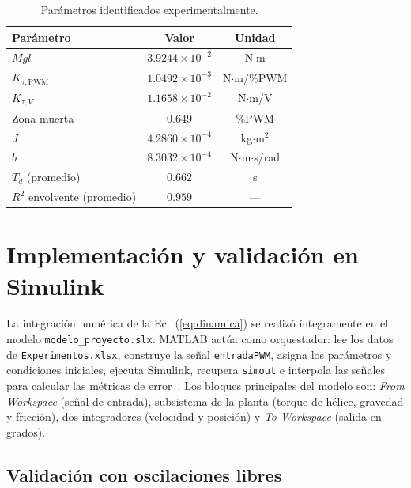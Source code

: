 \documentclass[journal, 10pt, twocolumn]{IEEEtran}
\begin{document}
\begin{table}[H]
  \centering
  \caption{Parámetros identificados experimentalmente.}
  \label{tab:parametros}
  \begin{tabular}{lcc}
    \toprule
    Parámetro & Valor & Unidad \\
    \midrule
    $Mgl$                          & $3.9244\times10^{-2}$  & N$\cdot$m \\
    $K_{\tau,\mathrm{PWM}}$        & $1.0492\times10^{-3}$  & N$\cdot$m/\%PWM \\
    $K_{\tau,V}$                   & $1.1658\times10^{-2}$  & N$\cdot$m/V \\
    Zona muerta                    & $0.649$                & \%PWM \\
    $J$                            & $4.2860\times10^{-4}$  & kg$\cdot$m$^2$ \\
    $b$                            & $8.3032\times10^{-4}$  & N$\cdot$m$\cdot$s/rad \\
    $T_d$ (promedio)               & $0.662$                & s \\
    $R^2$ envolvente (promedio)    & $0.959$                & --- \\
    \bottomrule
  \end{tabular}
\end{table}

\section{Implementación y validación en Simulink}

La integración numérica de la Ec.~(\ref{eq:dinamica}) se realizó
íntegramente en el modelo \texttt{modelo\_proyecto.slx}. MATLAB actúa
como orquestador: lee los datos de \texttt{Experimentos.xlsx}, construye
la señal \texttt{entradaPWM}, asigna los parámetros y condiciones iniciales,
ejecuta Simulink, recupera \texttt{simout} e interpola las señales para
calcular las métricas de error~\cite{fromws}. Los bloques principales del
modelo son: \textit{From Workspace} (señal de entrada), subsistema de la
planta (torque de hélice, gravedad y fricción), dos integradores (velocidad
y posición) y \textit{To Workspace} (salida en grados).

\subsection{Validación con oscilaciones libres}
\end{document}
